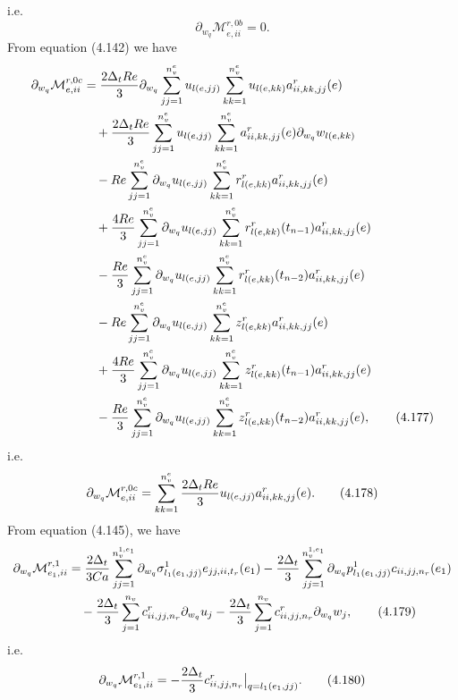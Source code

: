 \documentclass{article}
\begin{document}
i.e.
\begin{equation}
\partial_{w_q}\mathcal{M}_{e,ii}^{r,0b} = 0. \tag{4.176}
\end{equation}
From equation (4.142) we have
\begin{align}
\partial_{w_q}\mathcal{M}_{e,ii}^{r,0c} &= \frac{2\Delta_t Re}{3} \partial_{w_q} \sum_{jj=1}^{n_v^e} u_{l(e,jj)} \sum_{kk=1}^{n_v^e} u_{l(e,kk)} a_{ii,kk,jj}^r(e) \nonumber\\
&\quad + \frac{2\Delta_t Re}{3} \sum_{jj=1}^{n_v^e} u_{l(e,jj)} \sum_{kk=1}^{n_v^e} a_{ii,kk,jj}^r(e) \partial_{w_q} w_{l(e,kk)} \nonumber\\
&\quad - Re \sum_{jj=1}^{n_v^e} \partial_{w_q} u_{l(e,jj)} \sum_{kk=1}^{n_v^e} r_{l(e,kk)}^r a_{ii,kk,jj}^r(e) \nonumber\\
&\quad + \frac{4Re}{3} \sum_{jj=1}^{n_v^e} \partial_{w_q} u_{l(e,jj)} \sum_{kk=1}^{n_v^e} r_{l(e,kk)}^r(t_{n-1}) a_{ii,kk,jj}^r(e) \nonumber\\
&\quad - \frac{Re}{3} \sum_{jj=1}^{n_v^e} \partial_{w_q} u_{l(e,jj)} \sum_{kk=1}^{n_v^e} r_{l(e,kk)}^r(t_{n-2}) a_{ii,kk,jj}^r(e) \nonumber\\
&\quad - Re \sum_{jj=1}^{n_v^e} \partial_{w_q} u_{l(e,jj)} \sum_{kk=1}^{n_v^e} z_{l(e,kk)}^r a_{ii,kk,jj}^r(e) \nonumber\\
&\quad + \frac{4Re}{3} \sum_{jj=1}^{n_v^e} \partial_{w_q} u_{l(e,jj)} \sum_{kk=1}^{n_v^e} z_{l(e,kk)}^r(t_{n-1}) a_{ii,kk,jj}^r(e) \nonumber\\
&\quad - \frac{Re}{3} \sum_{jj=1}^{n_v^e} \partial_{w_q} u_{l(e,jj)} \sum_{kk=1}^{n_v^e} z_{l(e,kk)}^r(t_{n-2}) a_{ii,kk,jj}^r(e), \tag{4.177}
\end{align}
i.e.
\begin{equation}
\partial_{w_q}\mathcal{M}_{e,ii}^{r,0c} = \sum_{kk=1}^{n_v^e} \frac{2\Delta_t Re}{3} u_{l(e,jj)} a_{ii,kk,jj}^r(e). \tag{4.178}
\end{equation}
From equation (4.145), we have
\begin{align}
\partial_{w_q}\mathcal{M}_{e_1,ii}^{r,1} &= \frac{2\Delta_t}{3Ca} \sum_{jj=1}^{n_v^{1,e_1}} \partial_{w_q} \sigma_{l_1(e_1,jj)}^1 e_{jj,ii,t_r}(e_1) 
- \frac{2\Delta_t}{3} \sum_{jj=1}^{n_v^{1,e_1}} \partial_{w_q} p_{l_1(e_1,jj)}^1 c_{ii,jj,n_r}(e_1) \nonumber\\
&\quad - \frac{2\Delta_t}{3} \sum_{j=1}^{n_v} c_{ii,jj,n_r}^r \partial_{w_q} u_j 
- \frac{2\Delta_t}{3} \sum_{j=1}^{n_v} c_{ii,jj,n_r}^r \partial_{w_q} w_j, \tag{4.179}
\end{align}
i.e.
\begin{equation}
\partial_{w_q}\mathcal{M}_{e_1,ii}^{r,1} = -\frac{2\Delta_t}{3} c_{ii,jj,n_r}^r \big|_{q=l_1(e_1,jj)}. \tag{4.180}
\end{equation}
\end{document}
